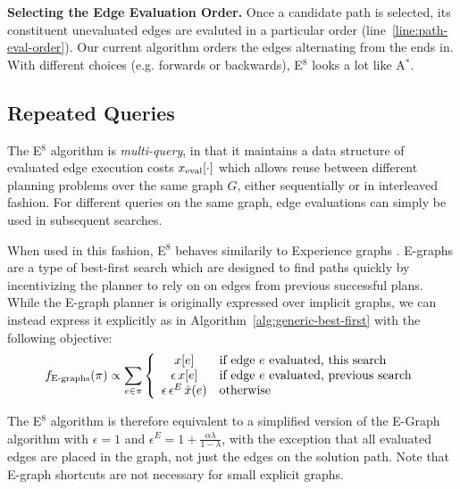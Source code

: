 \textbf{Selecting the Edge Evaluation Order.}
\label{subsec:alg-path-evaluation}
Once a candidate path is selected,
its constituent unevaluated edges are evaluted
in a particular order (line~\ref{line:path-eval-order}).
Our current algorithm
orders the edges alternating from the ends in.
With different choices (e.g. forwards or backwards),
E$^8$ looks a lot like A$^*$.

\subsection{Repeated Queries}

The E$^8$ algorithm is \emph{multi-query},
in that it maintains a data structure of evaluated edge
execution costs $x_{\mbox{\scriptsize eval}}[\cdot]$
which allows reuse between different planning problems
over the same graph $G$,
either sequentially or in interleaved fashion.
For different queries on the same graph,
edge evaluations can simply be used in subsequent searches.

When used in this fashion,
E$^8$ behaves similarily to Experience graphs%
\cite{phillips2012egraphs}.
E-graphs are a type of best-first search which
are designed to find paths quickly by incentivizing the planner
to rely on on edges from previous successful plans.
While the E-graph planner is originally expressed over implicit graphs,
we can instead express it explicitly
as in Algorithm~\ref{alg:generic-best-first}
with the following objective:
\begin{equation}
   f_{\mbox{\scriptsize E-graphs}}(\pi) \propto \sum_{e \in \pi} \left\{
   \begin{array}{cl}
      x[e] & \mbox{if edge } e \mbox{ evaluated, this search} \\
      \epsilon \, x[e] & \mbox{if edge } e \mbox{ evaluated, previous search} \\
     \epsilon \, \epsilon^E \, \hat{x}(e) & \mbox{otherwise} \\
   \end{array}
   \right.
\end{equation}

The E$^8$ algorithm
is therefore equivalent to a simplified version of the E-Graph algorithm
with $\epsilon=1$ and $\epsilon^E = 1 + \frac{\alpha \lambda}{1-\lambda}$,
with the exception that all evaluated edges are placed in the graph,
not just the edges on the solution path.
Note that E-graph shortcuts
are not necessary for small explicit graphs.

